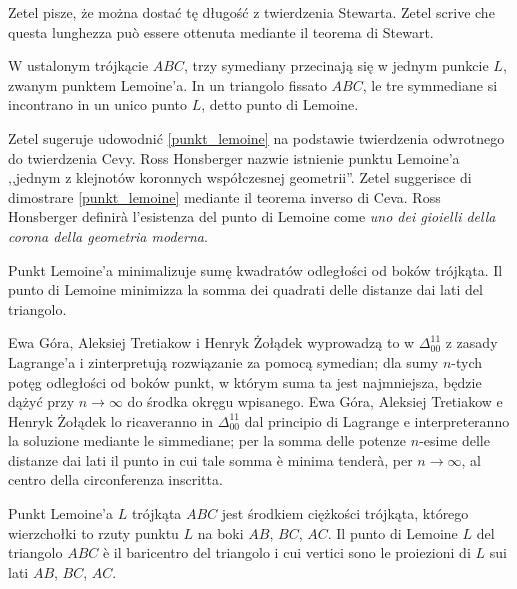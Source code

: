 Zetel \cite[s. 119]{zetel_2020} pisze, że można dostać tę długość z twierdzenia Stewarta. %
Zetel \cite[p. 119]{zetel_2020} scrive che questa lunghezza può essere ottenuta mediante il teorema di Stewart. %

\begin{proposition}
[punkt Lemoine'a] %
[punto di Lemoine] %
    \label{punkt_lemoine}%
    W ustalonym trójkącie $ABC$, trzy symediany przecinają się w jednym punkcie $L$, zwanym punktem Lemoine'a. %
    In un triangolo fissato $ABC$, le tre symmediane si incontrano in un unico punto $L$, detto punto di Lemoine. %
\end{proposition}

Zetel \cite[s. 114]{zetel_2020} sugeruje udowodnić \ref{punkt_lemoine} na podstawie twierdzenia odwrotnego do twierdzenia Cevy. %
Ross Honsberger nazwie istnienie punktu Lemoine'a ,,jednym z klejnotów koronnych współczesnej geometrii''. %
Zetel \cite[p. 114]{zetel_2020} suggerisce di dimostrare \ref{punkt_lemoine} mediante il teorema inverso di Ceva. %
Ross Honsberger definirà l'esistenza del punto di Lemoine come \emph{uno dei gioielli della corona della geometria moderna}. %

\begin{proposition}
    Punkt Lemoine'a minimalizuje sumę kwadratów odległości od boków trójkąta. %
    Il punto di Lemoine minimizza la somma dei quadrati delle distanze dai lati del triangolo. %
\end{proposition}

Ewa Góra, Aleksiej Tretiakow i Henryk Żołądek wyprowadzą to w $\Delta_{00}^{11}$ z zasady Lagrange'a i zinterpretują rozwiązanie za pomocą symedian; dla sumy $n$-tych potęg odległości od boków punkt, w którym suma ta jest najmniejsza, będzie dążyć przy $n \to \infty$ do środka okręgu wpisanego. %
Ewa Góra, Aleksiej Tretiakow e Henryk Żołądek lo ricaveranno in $\Delta_{00}^{11}$ dal principio di Lagrange e interpreteranno la soluzione mediante le simmediane; per la somma delle potenze $n$-esime delle distanze dai lati il punto in cui tale somma è minima tenderà, per $n \to \infty$, al centro della circonferenza inscritta. %


\begin{proposition}
    Punkt Lemoine'a $L$ trójkąta $ABC$ jest środkiem ciężkości trójkąta, którego wierzchołki to rzuty punktu $L$ na boki $AB$, $BC$, $AC$. %
    Il punto di Lemoine $L$ del triangolo $ABC$ è il baricentro del triangolo i cui vertici sono le proiezioni di $L$ sui lati $AB$, $BC$, $AC$. %
\end{proposition}

